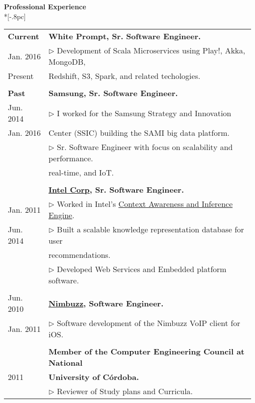 \documentclass[letter,11pt,english]{article}
\begin{document}
{\large \bf Professional Experience}\\*[-.8pc]
\underline{\hspace{6in}}
\\
\begin{tabular}{ p{2cm} l }

  {\bf Current} 	& {\bf White Prompt, Sr. Software Engineer.}\\
   Jan. 2016    	& $\triangleright$ Development of Scala Microservices using Play!, Akka, MongoDB, \\ 
   Present      	& Redshift, S3, Spark, and related techologies. \\
                
\\
  {\bf Past}    	& {\bf Samsung, Sr. Software Engineer.}\\
   Jun. 2014   	& $\triangleright$ I worked for the Samsung Strategy and Innovation\\
   Jan. 2016    	& Center (SSIC) building the SAMI big data platform.\\
                	& $\triangleright$ Sr. Software Engineer with focus on scalability and performance.\\
                        & real-time, and IoT. \\
\\
  {\bf }    		& {\bf \href{http://www.intel.com}{Intel Corp}, Sr. Software Engineer.}\\
   Jan. 2011     	& $\triangleright$ Worked in Intel's \href{https://software.intel.com/en-us/context-sensing-sdk}{Context Awareness and  Inference Engine}.\\
   Jun. 2014	& $\triangleright$ Built a scalable knowledge representation database for user\\               
                	& recommendations.\\
                	& $\triangleright$ Developed Web Services and Embedded platform software.\\
\\     
   Jun. 2010   	& {\bf \href{http://www.nimbuzz.com/en/about}{Nimbuzz}, Software Engineer.}\\
   Jan. 2011   	& $\triangleright$ Software development of the Nimbuzz VoIP client for iOS.\\ 
\\
           		& {\bf Member of the Computer Engineering Council at National} \\
  2011	       	& {\bf University of C\'ordoba.}\\ 
			& $\triangleright$ Reviewer of Study plans and Curricula.\\
\end{tabular}
\end{document}
